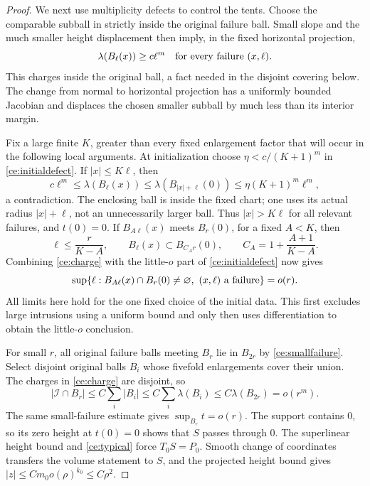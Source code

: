 \begin{proof}
We next use multiplicity defects to control the tents.  Choose the
comparable subball in  strictly inside the original
failure ball.  Small slope and the much smaller height displacement
then imply, in the fixed horizontal projection,
\begin{equation}
 \label{ce:charge}
 \lambda(B_\ell(x))\ge c\ell^m
       \quad\hbox{for every failure }(x,\ell).
\end{equation}
This charges inside the original ball, a fact needed in the disjoint
covering below.  The change from normal to horizontal projection has
a uniformly bounded Jacobian and displaces the chosen smaller
subball by much less than its interior margin.

Fix a large finite $K$, greater than every fixed enlargement factor
that will occur in the following local arguments.  At initialization
choose $\eta<c/(K+1)^m$ in \eqref{ce:initialdefect}.  If
$|x|\le K\ell$, then
\[
 c\ell^m\le\lambda(B_\ell(x))
       \le\lambda(B_{|x|+\ell}(0))
       \le\eta(K+1)^m\ell^m,
\]
a contradiction.  The enclosing ball is inside the fixed chart;
one uses its actual radius $|x|+\ell$, not an unnecessarily larger
ball.  Thus $|x|>K\ell$ for all relevant failures, and $t(0)=0$.
If $B_{A\ell}(x)$ meets $B_r(0)$, for a fixed $A<K$, then
\[
 \ell\le\frac r{K-A},\qquad
 B_\ell(x)\subset B_{C_A r}(0),\qquad
 C_A=1+\frac{A+1}{K-A}.
\]
Combining \eqref{ce:charge} with the little-$o$ part of
\eqref{ce:initialdefect} now gives
\begin{equation}
 \label{ce:smallfailure}
 \sup\{\ell:B_{A\ell}(x)\cap B_r(0)\ne\varnothing,
                      \ (x,\ell)\hbox{ a failure}\}=o(r).
\end{equation}
All limits here hold for the one fixed choice of the initial data.
This first excludes large intrusions using a uniform bound and only
then uses differentiation to obtain the little-$o$ conclusion.

For small $r$, all original failure balls meeting $B_r$ lie in
$B_{2r}$ by \eqref{ce:smallfailure}.  Select disjoint original balls
$B_i$ whose fivefold enlargements cover their union.  The charges in
\eqref{ce:charge} are disjoint, so
\[
 |\mathcal I\cap B_r|
       \le C\sum_i|B_i|
       \le C\sum_i\lambda(B_i)
       \le C\lambda(B_{2r})=o(r^m).
\]
The same small-failure estimate gives $\sup_{B_r}t=o(r)$.
The support contains $0$, so its zero height at $t(0)=0$ shows that
$S$ passes through $0$.  The superlinear height bound and
\eqref{ce:typical} force $T_0S=P_0$.  Smooth change of coordinates
transfers the volume statement to $S$, and the projected height
bound gives $|z|\le Cm_0o(\rho)^{k_0}\le C\rho^2$.
\end{proof}

